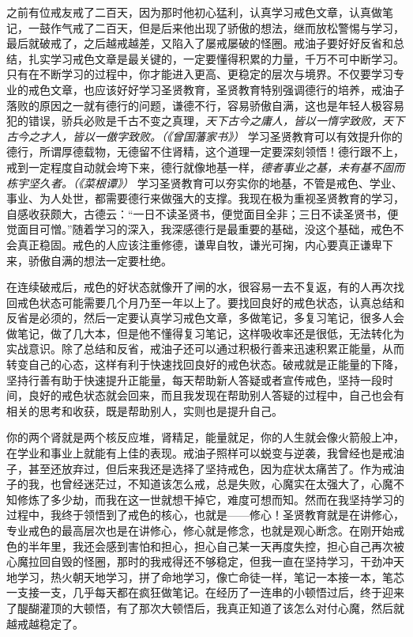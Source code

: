 之前有位戒友戒了二百天，因为那时他初心猛利，认真学习戒色文章，认真做笔记，一鼓作气戒了二百天，但是后来他出现了骄傲的想法，继而放松警惕与学习，最后就破戒了，之后越戒越差，又陷入了屡戒屡破的怪圈。戒油子要好好反省和总结，扎实学习戒色文章是最关键的，一定要懂得积累的力量，千万不可中断学习。只有在不断学习的过程中，你才能进入更高、更稳定的层次与境界。不仅要学习专业的戒色文章，也应该好好学习圣贤教育，圣贤教育特别强调德行的培养，戒油子落败的原因之一就有德行的问题，谦德不行，容易骄傲自满，这也是年轻人极容易犯的错误，骄兵必败是千古不变之真理，\textit{天下古今之庸人，皆以一惰字致败，天下古今之才人，皆以一傲字致败。（《曾国藩家书》）} 学习圣贤教育可以有效提升你的德行，所谓厚德载物，无德留不住肾精，这个道理一定要深刻领悟！德行跟不上，戒到一定程度自动就会垮下来，德行就像地基一样，\textit{德者事业之基，未有基不固而栋宇坚久者。（《菜根谭》）} 学习圣贤教育可以夯实你的地基，不管是戒色、学业、事业、为人处世，都需要德行来做强大的支撑。我现在极为重视圣贤教育的学习，自感收获颇大，古德云：“一日不读圣贤书，便觉面目全非；三日不读圣贤书，便觉面目可憎。”随着学习的深入，我深感德行是最重要的基础，没这个基础，戒色不会真正稳固。戒色的人应该注重修德，谦卑自牧，谦光可掬，内心要真正谦卑下来，骄傲自满的想法一定要杜绝。

在连续破戒后，戒色的好状态就像开了闸的水，很容易一去不复返，有的人再次找回戒色状态可能需要几个月乃至一年以上了。要找回良好的戒色状态，认真总结和反省是必须的，然后一定要认真学习戒色文章，多做笔记，多复习笔记，很多人会做笔记，做了几大本，但是他不懂得复习笔记，这样吸收率还是很低，无法转化为实战意识。除了总结和反省，戒油子还可以通过积极行善来迅速积累正能量，从而转变自己的心态，这样有利于快速找回良好的戒色状态。破戒就是正能量的下降，坚持行善有助于快速提升正能量，每天帮助新人答疑或者宣传戒色，坚持一段时间，良好的戒色状态就会回来，而且我发现在帮助别人答疑的过程中，自己也会有相关的思考和收获，既是帮助别人，实则也是提升自己。

你的两个肾就是两个核反应堆，肾精足，能量就足，你的人生就会像火箭般上冲，在学业和事业上就能有上佳的表现。戒油子照样可以蜕变与逆袭，我曾经也是戒油子，甚至还放弃过，但后来我还是选择了坚持戒色，因为症状太痛苦了。作为戒油子的我，也曾经迷茫过，不知道该怎么戒，总是失败，心魔实在太强大了，心魔不知修炼了多少劫，而我在这一世就想干掉它，难度可想而知。然而在我坚持学习的过程中，我终于领悟到了戒色的核心，也就是——修心！圣贤教育就是在讲修心，专业戒色的最高层次也是在讲修心，修心就是修念，也就是观心断念。在刚开始戒色的半年里，我还会感到害怕和担心，担心自己某一天再度失控，担心自己再次被心魔拉回自毁的怪圈，那时的我戒得还不够稳定，但我一直在坚持学习，干劲冲天地学习，热火朝天地学习，拼了命地学习，像亡命徒一样，笔记一本接一本，笔芯一支接一支，几乎每天都在疯狂做笔记。在经历了一连串的小顿悟过后，终于迎来了醍醐灌顶的大顿悟，有了那次大顿悟后，我真正知道了该怎么对付心魔，然后就越戒越稳定了。

